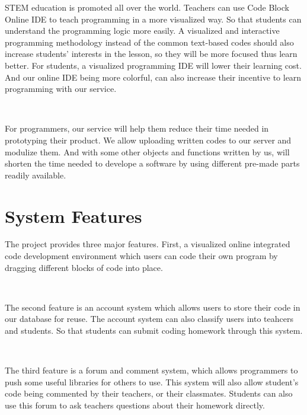   STEM education is promoted all over the world. Teachers can use Code Block Online IDE to teach programming in a more visualized way. So that students can understand the programming logic more easily. A visualized and interactive programming methodology instead of the common text-based codes should also increase students' interests in the lesson, so they will be more focused thus learn better. For students, a visualized programming IDE will lower their learning cost. And our online IDE being more colorful, can also increase their incentive to learn programming with our service.

  ~

  For programmers, our service will help them reduce their time needed in prototyping their product. We allow uploading written codes to our server and modulize them. And with some other objects and functions written by us, will shorten the time needed to develope a software by using different pre-made parts readily available.
  \section{System Features}
  The project provides three major features. First, a visualized online integrated code development environment which users can code their own program by dragging different blocks of code into place.\par~

  The second feature is an account system which allows users to store their code in our database for reuse. The account system can also classify users into teahcers and students. So that students can submit coding homework through this system.\par~

  The third feature is a forum and comment system, which allows programmers to push some useful libraries for others to use. This system will also allow student's code being commented by their teachers, or their classmates. Students can also use this forum to ask teachers questions about their homework directly.
